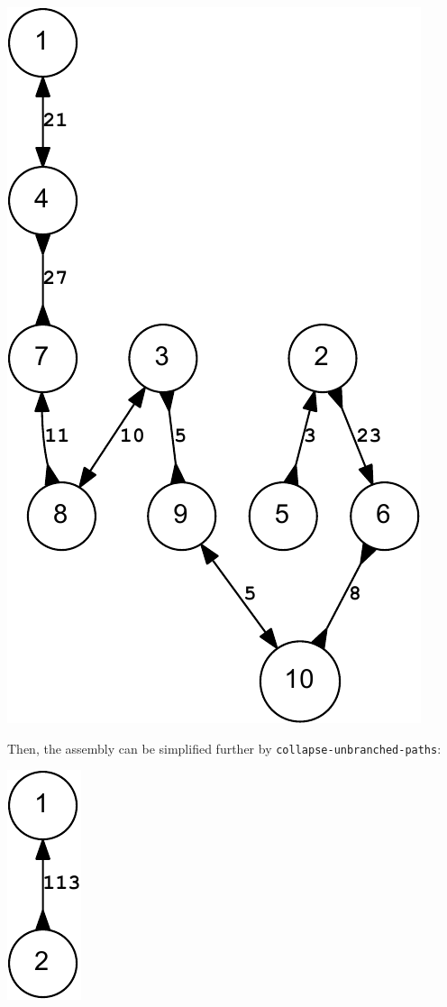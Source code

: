 \documentclass[12pt]{article}
\newcommand{\ProgramName}[1]{{\tt #1}}
\begin{document}
\begin{center}
	\includegraphics[scale=0.8]{example_200bp.reduced.mapped.bidigraph-crop.pdf}	
\end{center}

Then, the assembly can be simplified further by
\ProgramName{collapse-unbranched-paths}:

\begin{center}
	\includegraphics[scale=0.8]{example_200bp.reduced.mapped.collapsed.bidigraph-crop.pdf}	
\end{center}
\end{document}
